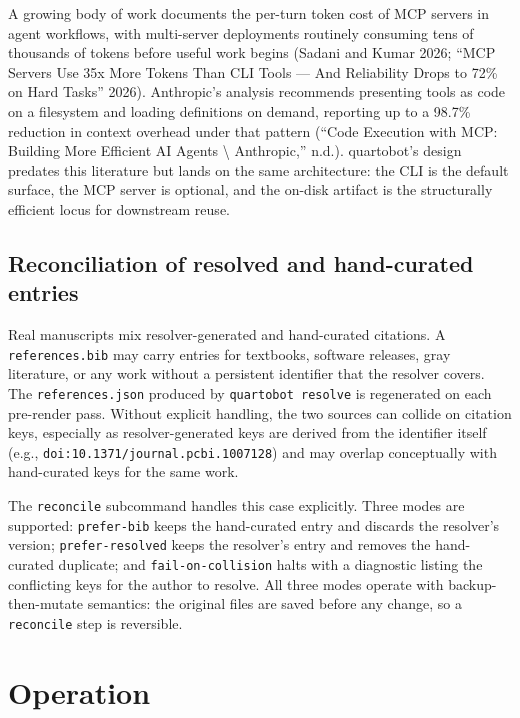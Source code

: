 \documentclass[
  letterpaper,
  DIV=11,
  numbers=noendperiod]{scrartcl}
\begin{document}
A growing body of work documents the per-turn token cost of MCP servers
in agent workflows, with multi-server deployments routinely consuming
tens of thousands of tokens before useful work begins (Sadani and Kumar
2026; {``MCP {Servers} {Use} 35x {More} {Tokens} {Than} {CLI} {Tools}
--- {And} {Reliability} {Drops} to 72\% on {Hard} {Tasks}''} 2026).
Anthropic's analysis recommends presenting tools as code on a filesystem
and loading definitions on demand, reporting up to a 98.7\% reduction in
context overhead under that pattern ({``Code Execution with {MCP:}
Building More Efficient {AI} Agents \textbackslash{} {Anthropic},''}
n.d.). quartobot's design predates this literature but lands on the same
architecture: the CLI is the default surface, the MCP server is
optional, and the on-disk artifact is the structurally efficient locus
for downstream reuse.

\subsection{Reconciliation of resolved and hand-curated
entries}\label{reconciliation-of-resolved-and-hand-curated-entries}

Real manuscripts mix resolver-generated and hand-curated citations. A
\texttt{references.bib} may carry entries for textbooks, software
releases, gray literature, or any work without a persistent identifier
that the resolver covers. The \texttt{references.json} produced by
\texttt{quartobot\ resolve} is regenerated on each pre-render pass.
Without explicit handling, the two sources can collide on citation keys,
especially as resolver-generated keys are derived from the identifier
itself (e.g., \texttt{doi:10.1371/journal.pcbi.1007128}) and may overlap
conceptually with hand-curated keys for the same work.

The \texttt{reconcile} subcommand handles this case explicitly. Three
modes are supported: \texttt{prefer-bib} keeps the hand-curated entry
and discards the resolver's version; \texttt{prefer-resolved} keeps the
resolver's entry and removes the hand-curated duplicate; and
\texttt{fail-on-collision} halts with a diagnostic listing the
conflicting keys for the author to resolve. All three modes operate with
backup-then-mutate semantics: the original files are saved before any
change, so a \texttt{reconcile} step is reversible.

\section{Operation}\label{operation}
\end{document}
